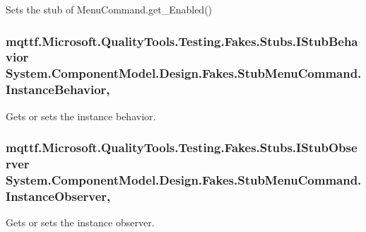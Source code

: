 Sets the stub of Menu\-Command.\-get\-\_\-\-Enabled()

\hypertarget{class_system_1_1_component_model_1_1_design_1_1_fakes_1_1_stub_menu_command_a84ecdaf2e2fbfe766f3988857daae5a4}{
\subsubsection[{Instance\-Behavior}]{\setlength{\rightskip}{0pt plus 5cm}mqttf.\-Microsoft.\-Quality\-Tools.\-Testing.\-Fakes.\-Stubs.\-I\-Stub\-Behavior System.\-Component\-Model.\-Design.\-Fakes.\-Stub\-Menu\-Command.\-Instance\-Behavior\hspace{0.3cm}{\ttfamily [get]}, {\ttfamily [set]}}}\label{class_system_1_1_component_model_1_1_design_1_1_fakes_1_1_stub_menu_command_a84ecdaf2e2fbfe766f3988857daae5a4}


Gets or sets the instance behavior.

\hypertarget{class_system_1_1_component_model_1_1_design_1_1_fakes_1_1_stub_menu_command_acc286e46df529075513104c69932afae}{
\subsubsection[{Instance\-Observer}]{\setlength{\rightskip}{0pt plus 5cm}mqttf.\-Microsoft.\-Quality\-Tools.\-Testing.\-Fakes.\-Stubs.\-I\-Stub\-Observer System.\-Component\-Model.\-Design.\-Fakes.\-Stub\-Menu\-Command.\-Instance\-Observer\hspace{0.3cm}{\ttfamily [get]}, {\ttfamily [set]}}}\label{class_system_1_1_component_model_1_1_design_1_1_fakes_1_1_stub_menu_command_acc286e46df529075513104c69932afae}


Gets or sets the instance observer.

